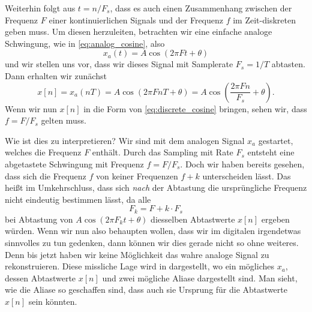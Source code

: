 Weiterhin folgt aus $t = n/F_s$, dass es auch einen Zusammenhang zwischen der Frequenz $F$ einer kontinuierlichen Signals und der Frequenz $f$ im Zeit-diskreten geben muss.
Um diesen herzuleiten, betrachten wir eine einfache analoge Schwingung, wie in \eqref{eq:analog_cosine}, also
\[
x_a(t) = A \cos(2 \pi F t + \theta)
\]
und wir stellen uns vor, dass wir dieses Signal mit Samplerate $F_s = 1/T$ abtasten. Dann erhalten wir zunächst
\[
x[n] 
    = x_a(n T) 
    = A \cos(2 \pi F n T + \theta) 
    = A \cos\left(\frac{2 \pi F n}{F_s} + \theta\right).
\]
Wenn wir nun $x[n]$ in die Form von \eqref{eq:discrete_cosine} bringen, sehen wir, dass $f = F/F_s$ gelten muss.

Wie ist dies zu interpretieren? 
Wir sind mit dem analogen Signal $x_a$ gestartet, welches die Frequenz $F$ enthält.
Durch das Sampling mit Rate $F_s$ entsteht eine abgetastete Schwingung mit Frequenz $f = F/F_s$. 
Doch wir haben bereits gesehen, dass sich die Frequenz $f$ von keiner Frequenzen $f + k$ unterscheiden lässt.
Das heißt im Umkehrschluss, dass sich \emph{nach} der Abtastung die ursprüngliche Frequenz nicht eindeutig bestimmen lässt, da alle
\[
F_k = F + k \cdot F_s 
\]
bei Abtastung von $A \cos(2 \pi F_k t + \theta)$ diesselben Abtastwerte $x[n]$ ergeben würden.
Wenn wir nun also behaupten wollen, dass wir im digitalen irgendetwas sinnvolles zu tun gedenken, dann können wir dies gerade nicht so ohne weiteres.
Denn bis jetzt haben wir keine Möglichkeit das wahre analoge Signal zu rekonstruieren.
Diese missliche Lage wird in  dargestellt, wo ein mögliches
$x_a$, dessen Abtastwerte $x[n]$ und zwei mögliche Aliase dargestellt sind.
Man sieht, wie die Aliase so geschaffen sind, dass auch sie Ursprung für die Abtastwerte $x[n]$ sein könnten.
%
